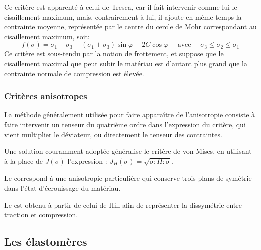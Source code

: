 Ce critère 
est apparenté à celui de Tresca, 
car il fait intervenir comme lui le cisaillement maximum, mais, contrairement à lui, il ajoute en même temps 
la contrainte \og moyenne\fg{}, représentée par le centre du cercle de Mohr correspondant au cisaillement 
maximum, soit:
\begin{equation} f(\sigma) = \sigma_1 - \sigma_3 + (\sigma_1 + \sigma_3) \sin\varphi - 2C\cos \varphi \quad
\text{ avec } \quad \sigma_3 \le \sigma_2 \le \sigma_1 \end{equation}
Ce critère est sous-tendu par la notion de frottement, et suppose que le cisaillement maximal que peut 
subir le matériau est d'autant plus grand que la contrainte normale de compression est élevée.

\medskip
\subsubsection{Critères anisotropes}

La méthode généralement utilisée pour faire apparaître de l'anisotropie consiste à faire intervenir 
un tenseur du quatrième ordre dans l'expression du critère, qui vient multiplier le déviateur, ou directement 
le tenseur des contraintes. 

Une solution couramment adoptée généralise le critère de von Mises, en utilisant à la place de $J(\sigma)$ 
l'expression : $J_H(\sigma) = \sqrt{\sigma : H : \sigma}$.

\medskip
Le  
correspond à une anisotropie particulière qui conserve trois plans de  symétrie dans l'état d'écrouissage du 
matériau. 

\medskip
Le  
est obtenu à partir de celui de Hill afin de représenter la dissymétrie entre traction et compression.







\medskip
\subsection{Les élastomères}

